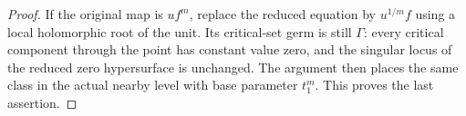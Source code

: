 \begin{proof}
If the original map is $u f^m$, replace the reduced
equation by $u^{1/m}f$ using a local holomorphic
root of the unit. Its critical-set germ is still
$\Gamma$: every critical component through the
point has constant value zero, and the singular
locus of the reduced zero hypersurface is unchanged.
The argument then places the
same class in the actual nearby level with base
parameter $t_1^m$. This proves the last assertion.
\end{proof}


